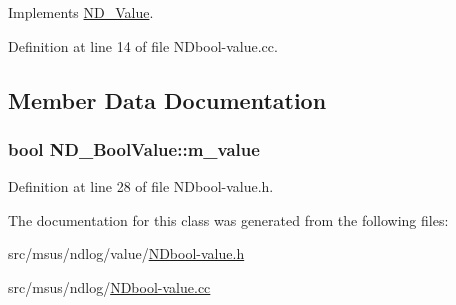 Implements \hyperlink{class_n_d___value_a7660a0e6c07a198410fc05725d903219}{N\-D\-\_\-\-Value}.



Definition at line 14 of file N\-Dbool-\/value.\-cc.



\subsection{Member Data Documentation}
\hypertarget{class_n_d___bool_value_a9288f3771b3cb35f65cc1d98f577d4f3}{
\subsubsection[{m\-\_\-value}]{\setlength{\rightskip}{0pt plus 5cm}bool N\-D\-\_\-\-Bool\-Value\-::m\-\_\-value\hspace{0.3cm}{\ttfamily [protected]}}}\label{class_n_d___bool_value_a9288f3771b3cb35f65cc1d98f577d4f3}


Definition at line 28 of file N\-Dbool-\/value.\-h.



The documentation for this class was generated from the following files\-:\begin{DoxyCompactItemize}
\item 
src/msus/ndlog/value/\hyperlink{_n_dbool-value_8h}{N\-Dbool-\/value.\-h}\item 
src/msus/ndlog/\hyperlink{_n_dbool-value_8cc}{N\-Dbool-\/value.\-cc}\end{DoxyCompactItemize}
